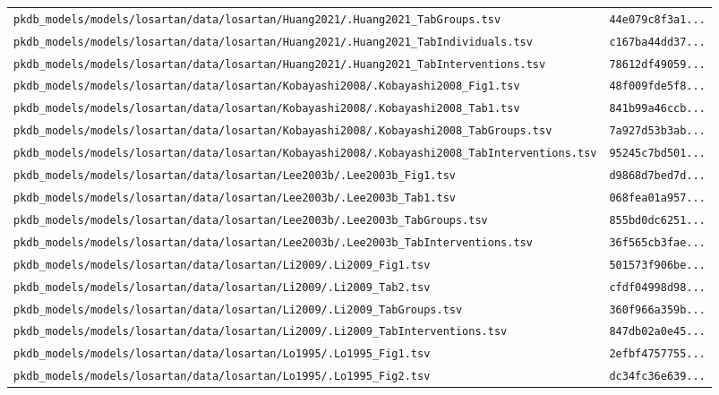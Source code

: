 \begin{longtable}{ll}
\texttt{pkdb\_models/models/losartan/data/losartan/Huang2021/.Huang2021\_TabGroups.tsv} & \texttt{44e079c8f3a1...} \\
\texttt{pkdb\_models/models/losartan/data/losartan/Huang2021/.Huang2021\_TabIndividuals.tsv} & \texttt{c167ba44dd37...} \\
\texttt{pkdb\_models/models/losartan/data/losartan/Huang2021/.Huang2021\_TabInterventions.tsv} & \texttt{78612df49059...} \\
\texttt{pkdb\_models/models/losartan/data/losartan/Kobayashi2008/.Kobayashi2008\_Fig1.tsv} & \texttt{48f009fde5f8...} \\
\texttt{pkdb\_models/models/losartan/data/losartan/Kobayashi2008/.Kobayashi2008\_Tab1.tsv} & \texttt{841b99a46ccb...} \\
\texttt{pkdb\_models/models/losartan/data/losartan/Kobayashi2008/.Kobayashi2008\_TabGroups.tsv} & \texttt{7a927d53b3ab...} \\
\texttt{pkdb\_models/models/losartan/data/losartan/Kobayashi2008/.Kobayashi2008\_TabInterventions.tsv} & \texttt{95245c7bd501...} \\
\texttt{pkdb\_models/models/losartan/data/losartan/Lee2003b/.Lee2003b\_Fig1.tsv} & \texttt{d9868d7bed7d...} \\
\texttt{pkdb\_models/models/losartan/data/losartan/Lee2003b/.Lee2003b\_Tab1.tsv} & \texttt{068fea01a957...} \\
\texttt{pkdb\_models/models/losartan/data/losartan/Lee2003b/.Lee2003b\_TabGroups.tsv} & \texttt{855bd0dc6251...} \\
\texttt{pkdb\_models/models/losartan/data/losartan/Lee2003b/.Lee2003b\_TabInterventions.tsv} & \texttt{36f565cb3fae...} \\
\texttt{pkdb\_models/models/losartan/data/losartan/Li2009/.Li2009\_Fig1.tsv} & \texttt{501573f906be...} \\
\texttt{pkdb\_models/models/losartan/data/losartan/Li2009/.Li2009\_Tab2.tsv} & \texttt{cfdf04998d98...} \\
\texttt{pkdb\_models/models/losartan/data/losartan/Li2009/.Li2009\_TabGroups.tsv} & \texttt{360f966a359b...} \\
\texttt{pkdb\_models/models/losartan/data/losartan/Li2009/.Li2009\_TabInterventions.tsv} & \texttt{847db02a0e45...} \\
\texttt{pkdb\_models/models/losartan/data/losartan/Lo1995/.Lo1995\_Fig1.tsv} & \texttt{2efbf4757755...} \\
\texttt{pkdb\_models/models/losartan/data/losartan/Lo1995/.Lo1995\_Fig2.tsv} & \texttt{dc34fc36e639...} \\

\end{longtable}
